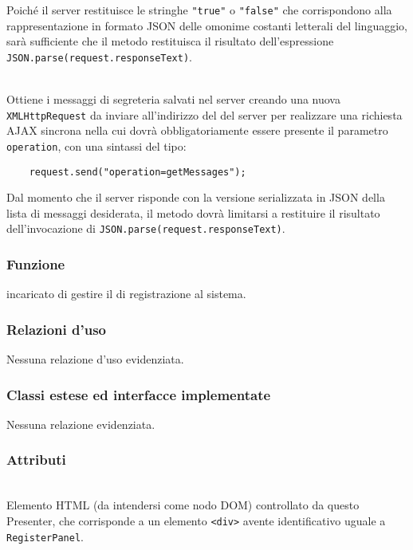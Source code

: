 \begin{description}
  Poiché il server restituisce le stringhe \verb'"true"' o \verb'"false"' che corrispondono alla rappresentazione in formato JSON delle omonime costanti letterali del linguaggio, sarà sufficiente che il metodo restituisca il risultato dell'espressione \verb'JSON.parse(request.responseText)'.
  
    \item{}\\
  Ottiene i messaggi di segreteria salvati nel server creando una nuova \verb'XMLHttpRequest' da inviare all'indirizzo del  del server per realizzare una richiesta AJAX sincrona nella cui  dovrà obbligatoriamente essere presente il parametro \verb'operation', con una sintassi del tipo:
  \begin{verbatim}
    request.send("operation=getMessages");
  \end{verbatim}
  
  Dal momento che il server risponde con la versione serializzata in JSON della lista di messaggi desiderata, il metodo dovrà limitarsi a restituire il risultato dell'invocazione di \verb'JSON.parse(request.responseText)'.
  
\end{description}





\subsubsection*{Funzione}
 incaricato di gestire il  di registrazione al sistema.

\subsubsection*{Relazioni d'uso}

Nessuna relazione d'uso evidenziata.

\subsubsection*{Classi estese ed interfacce implementate}

Nessuna relazione evidenziata.

\subsubsection*{Attributi}
\begin{description}
  \item{}\\
  Elemento HTML (da intendersi come nodo DOM) controllato da questo Presenter, che corrisponde a un elemento \verb'<div>' avente identificativo uguale a \verb'RegisterPanel'.
\end{description}

